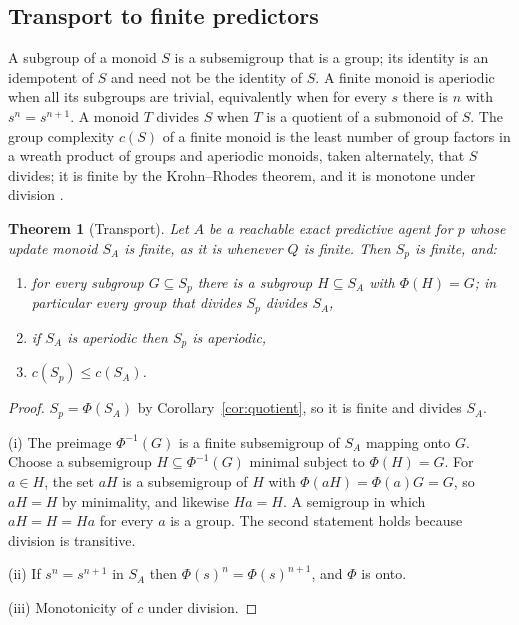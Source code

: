 \documentclass[10pt]{article}
\newtheorem{theorem}{Theorem}[section]
\theoremstyle{definition}
\theoremstyle{remark}
\begin{document}
\subsection{Transport to finite predictors}

A subgroup of a monoid $S$ is a subsemigroup that is a group; its
identity is an idempotent of $S$ and need not be the identity of $S$.
A finite monoid is aperiodic when all its subgroups are trivial,
equivalently when for every $s$ there is $n$ with $s^n=s^{n+1}$.  A
monoid $T$ divides $S$ when $T$ is a quotient of a submonoid of $S$.
The group complexity $c(S)$ of a finite monoid is the least number of
group factors in a wreath product of groups and aperiodic monoids,
taken alternately, that $S$ divides; it is finite by the
Krohn--Rhodes theorem, and it is monotone under division
\cite{KrohnRhodes1965,RhodesSteinberg2009}.

\begin{theorem}[Transport]
\label{thm:transport}
Let $A$ be a reachable exact predictive agent for $p$ whose update
monoid $S_A$ is finite, as it is whenever $Q$ is finite.  Then $S_p$
is finite, and:
\begin{enumerate}[label=(\roman*)]
  \item for every subgroup $G\subseteq S_p$ there is a subgroup
        $H\subseteq S_A$ with $\Phi(H)=G$; in particular every group
        that divides $S_p$ divides $S_A$,
  \item if $S_A$ is aperiodic then $S_p$ is aperiodic,
  \item $c(S_p)\le c(S_A)$.
\end{enumerate}
\end{theorem}

\begin{proof}
$S_p=\Phi(S_A)$ by Corollary~\ref{cor:quotient}, so it is
finite and divides $S_A$.

(i) The preimage $\Phi^{-1}(G)$ is a finite subsemigroup of $S_A$
mapping onto $G$.  Choose a subsemigroup $H\subseteq\Phi^{-1}(G)$
minimal subject to $\Phi(H)=G$.  For $a\in H$, the set $aH$ is a
subsemigroup of $H$ with $\Phi(aH)=\Phi(a)G=G$, so $aH=H$ by
minimality, and likewise $Ha=H$.  A semigroup in which $aH=H=Ha$ for
every $a$ is a group.  The second statement holds because division is
transitive.

(ii) If $s^n=s^{n+1}$ in $S_A$ then
$\Phi(s)^n=\Phi(s)^{n+1}$, and $\Phi$ is onto.

(iii) Monotonicity of $c$ under division.
\end{proof}
\end{document}
